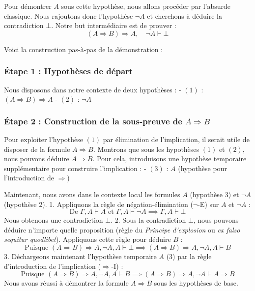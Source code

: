 \documentclass[11pt,a4paper]{article}
\begin{document}
Pour démontrer \(A\) sous cette hypothèse, nous allons procéder par
l'absurde classique. Nous rajoutons donc l'hypothèse \(\neg A\) et
cherchons à déduire la contradiction \(\bot\). Notre but intermédiaire
est de prouver :
\[(A \Rightarrow B) \Rightarrow A, \quad \neg A \vdash \bot\]

Voici la construction pas-à-pas de la démonstration :

\hypertarget{uxe9tape-1-hypothuxe8ses-de-duxe9part}{%
\subsubsection{Étape 1 : Hypothèses de
départ}\label{uxe9tape-1-hypothuxe8ses-de-duxe9part}}

Nous disposons dans notre contexte de deux hypothèses : - \((1)\) :
\((A \Rightarrow B) \Rightarrow A\) - \((2)\) : \(\neg A\)

\hypertarget{uxe9tape-2-construction-de-la-sous-preuve-de-a-rightarrow-b}{%
\subsubsection{\texorpdfstring{Étape 2 : Construction de la sous-preuve
de
\(A \Rightarrow B\)}{Étape 2 : Construction de la sous-preuve de A \textbackslash Rightarrow B}}\label{uxe9tape-2-construction-de-la-sous-preuve-de-a-rightarrow-b}}

Pour exploiter l'hypothèse \((1)\) par élimination de l'implication, il
serait utile de disposer de la formule \(A \Rightarrow B\). Montrons que
sous les hypothèses \((1)\) et \((2)\), nous pouvons déduire
\(A \Rightarrow B\). Pour cela, introduisons une hypothèse temporaire
supplémentaire pour construire l'implication : - \((3)\) : \(A\)
(hypothèse pour l'introduction de \(\Rightarrow\))

Maintenant, nous avons dans le contexte local les formules \(A\)
(hypothèse 3) et \(\neg A\) (hypothèse 2). 1. Appliquons la règle de
négation-élimination (\(\neg\)-E) sur \(A\) et \(\neg A\) :
\[\text{De } \Gamma, A \vdash A \text{ et } \Gamma, A \vdash \neg A \implies \Gamma, A \vdash \bot\]
Nous obtenons une contradiction \(\bot\). 2. Sous la contradiction
\(\bot\), nous pouvons déduire n'importe quelle proposition (règle du
\emph{Principe d'explosion} ou \emph{ex falso sequitur quodlibet}).
Appliquons cette règle pour déduire \(B\) :
\[\text{Puisque } (A \Rightarrow B) \Rightarrow A, \neg A, A \vdash \bot \implies (A \Rightarrow B) \Rightarrow A, \neg A, A \vdash B\]
3. Déchargeons maintenant l'hypothèse temporaire \(A\) (3) par la règle
d'introduction de l'implication (\(\Rightarrow\)-I) :
\[\text{Puisque } (A \Rightarrow B) \Rightarrow A, \neg A, A \vdash B \implies (A \Rightarrow B) \Rightarrow A, \neg A \vdash A \Rightarrow B\]
Nous avons réussi à démontrer la formule \(A \Rightarrow B\) sous les
hypothèses de base.
\end{document}
